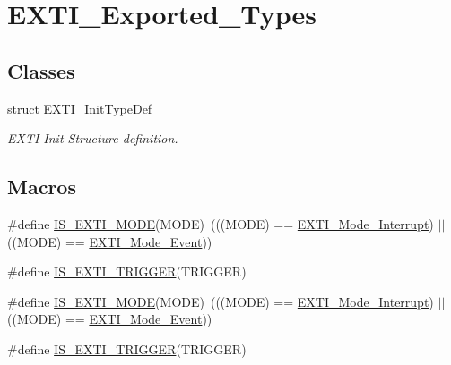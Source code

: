 \hypertarget{group___e_x_t_i___exported___types}{}\section{E\+X\+T\+I\+\_\+\+Exported\+\_\+\+Types}
\label{group___e_x_t_i___exported___types}
\subsection*{Classes}
\begin{DoxyCompactItemize}
\item 
struct \hyperlink{struct_e_x_t_i___init_type_def}{E\+X\+T\+I\+\_\+\+Init\+Type\+Def}
\begin{DoxyCompactList}\small\item\em E\+X\+TI Init Structure definition. \end{DoxyCompactList}\end{DoxyCompactItemize}
\subsection*{Macros}
\begin{DoxyCompactItemize}
\item 
\#define \hyperlink{group___e_x_t_i___exported___types_ga8429170f3320b90227f9f5b252c1c5eb}{I\+S\+\_\+\+E\+X\+T\+I\+\_\+\+M\+O\+DE}(M\+O\+DE)~(((M\+O\+DE) == \hyperlink{group___e_x_t_i___exported___types_gad5e69af98dc0dfdf64417adc1cf57929a8c6ccdd7b1bc4872731306537e8c3b42}{E\+X\+T\+I\+\_\+\+Mode\+\_\+\+Interrupt}) $\vert$$\vert$ ((M\+O\+DE) == \hyperlink{group___e_x_t_i___exported___types_gad5e69af98dc0dfdf64417adc1cf57929aa38ef186929ec74786df79877ea124a7}{E\+X\+T\+I\+\_\+\+Mode\+\_\+\+Event}))
\item 
\#define \hyperlink{group___e_x_t_i___exported___types_gaee95ec6288944a6245696896604e509e}{I\+S\+\_\+\+E\+X\+T\+I\+\_\+\+T\+R\+I\+G\+G\+ER}(T\+R\+I\+G\+G\+ER)
\item 
\#define \hyperlink{group___e_x_t_i___exported___types_ga8429170f3320b90227f9f5b252c1c5eb}{I\+S\+\_\+\+E\+X\+T\+I\+\_\+\+M\+O\+DE}(M\+O\+DE)~(((M\+O\+DE) == \hyperlink{group___e_x_t_i___exported___types_gad5e69af98dc0dfdf64417adc1cf57929a8c6ccdd7b1bc4872731306537e8c3b42}{E\+X\+T\+I\+\_\+\+Mode\+\_\+\+Interrupt}) $\vert$$\vert$ ((M\+O\+DE) == \hyperlink{group___e_x_t_i___exported___types_gad5e69af98dc0dfdf64417adc1cf57929aa38ef186929ec74786df79877ea124a7}{E\+X\+T\+I\+\_\+\+Mode\+\_\+\+Event}))
\item 
\#define \hyperlink{group___e_x_t_i___exported___types_gaee95ec6288944a6245696896604e509e}{I\+S\+\_\+\+E\+X\+T\+I\+\_\+\+T\+R\+I\+G\+G\+ER}(T\+R\+I\+G\+G\+ER)
\end{DoxyCompactItemize}
